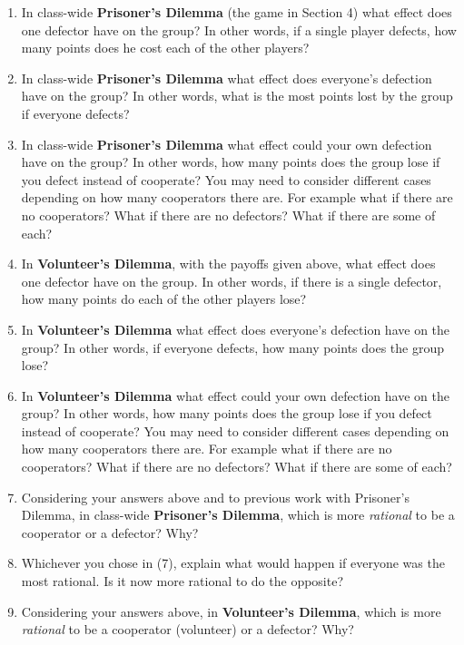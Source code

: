  
\begin{enumerate}
\item In class-wide {\bf Prisoner's Dilemma} (the game in Section 4) what effect does one defector have on the group? In other words, if a single player defects, how many points does he cost each of the other players?

\item In class-wide {\bf Prisoner's Dilemma} what effect does everyone's defection have on the group? In other words, what is the most points lost by the group if everyone defects? 

\item In class-wide {\bf Prisoner's Dilemma} what effect could your own defection have on the group? In other words, how many points does the group lose if you defect instead of cooperate? You may need to consider different cases depending on how many cooperators there are. For example what if there are no cooperators? What if there are no defectors? What if there are some of each?

\item In {\bf Volunteer's Dilemma}, with the payoffs given above, what effect does one defector have on the group. In other words, if there is a single defector, how many points do each of the other players lose?

\item In {\bf Volunteer's Dilemma} what effect does everyone's defection have on the group? In other words, if everyone defects, how many points does the group lose?

\item In {\bf Volunteer's Dilemma} what effect could your own defection have on the group? In other words, how many points does the group lose if you defect instead of cooperate? You may need to consider different cases depending on how many cooperators there are. For example what if there are no cooperators? What if there are no defectors? What if there are some of each?

\item Considering your answers above and to previous work with Prisoner's Dilemma, in class-wide {\bf Prisoner's Dilemma}, which is more {\it rational} to be a cooperator or a defector? Why? 

\item Whichever you chose in (7), explain what would happen if everyone was the most rational. Is it now more rational to do the opposite?

\item Considering your answers above, in {\bf Volunteer's Dilemma}, which is more {\it rational} to be a cooperator (volunteer) or a defector? Why?



\end{enumerate}
